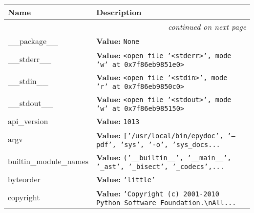     \vspace{-1cm}
\hspace{\varindent}\begin{longtable}{|p{\varnamewidth}|p{\vardescrwidth}|l}
\cline{1-2}
\cline{1-2} \centering \textbf{Name} & \centering \textbf{Description}& \\
\cline{1-2}
\endhead\cline{1-2}\multicolumn{3}{r}{\small\textit{continued on next page}}\\\endfoot\cline{1-2}
\endlastfoot\raggedright \_\-\_\-p\-a\-c\-k\-a\-g\-e\-\_\-\_\- & \raggedright \textbf{Value:} 
{\tt None}&\\
\cline{1-2}
\raggedright \_\-\_\-s\-t\-d\-e\-r\-r\-\_\-\_\- & \raggedright \textbf{Value:} 
{\tt {\textless}open file '{\textless}stderr{\textgreater}', mode 'w' at 0x7f86eb9851e0{\textgreater}}&\\
\cline{1-2}
\raggedright \_\-\_\-s\-t\-d\-i\-n\-\_\-\_\- & \raggedright \textbf{Value:} 
{\tt {\textless}open file '{\textless}stdin{\textgreater}', mode 'r' at 0x7f86eb9850c0{\textgreater}}&\\
\cline{1-2}
\raggedright \_\-\_\-s\-t\-d\-o\-u\-t\-\_\-\_\- & \raggedright \textbf{Value:} 
{\tt {\textless}open file '{\textless}stdout{\textgreater}', mode 'w' at 0x7f86eb985150{\textgreater}}&\\
\cline{1-2}
\raggedright a\-p\-i\-\_\-v\-e\-r\-s\-i\-o\-n\- & \raggedright \textbf{Value:} 
{\tt 1013}&\\
\cline{1-2}
\raggedright a\-r\-g\-v\- & \raggedright \textbf{Value:} 
{\tt \texttt{[}\texttt{'}\texttt{/usr/local/bin/epydoc}\texttt{'}\texttt{, }\texttt{'}\texttt{--pdf}\texttt{'}\texttt{, }\texttt{'}\texttt{sys}\texttt{'}\texttt{, }\texttt{'}\texttt{-o}\texttt{'}\texttt{, }\texttt{'}\texttt{sys\_docs}\texttt{...}}&\\
\cline{1-2}
\raggedright b\-u\-i\-l\-t\-i\-n\-\_\-m\-o\-d\-u\-l\-e\-\_\-n\-a\-m\-e\-s\- & \raggedright \textbf{Value:} 
{\tt \texttt{(}\texttt{'}\texttt{\_\_builtin\_\_}\texttt{'}\texttt{, }\texttt{'}\texttt{\_\_main\_\_}\texttt{'}\texttt{, }\texttt{'}\texttt{\_ast}\texttt{'}\texttt{, }\texttt{'}\texttt{\_bisect}\texttt{'}\texttt{, }\texttt{'}\texttt{\_codecs}\texttt{'}\texttt{,}\texttt{...}}&\\
\cline{1-2}
\raggedright b\-y\-t\-e\-o\-r\-d\-e\-r\- & \raggedright \textbf{Value:} 
{\tt \texttt{'}\texttt{little}\texttt{'}}&\\
\cline{1-2}
\raggedright c\-o\-p\-y\-r\-i\-g\-h\-t\- & \raggedright \textbf{Value:} 
{\tt \texttt{'}\texttt{Copyright (c) 2001-2010 Python Software Foundation.{\textbackslash}nAll}\texttt{...}}&\\

\end{longtable}
